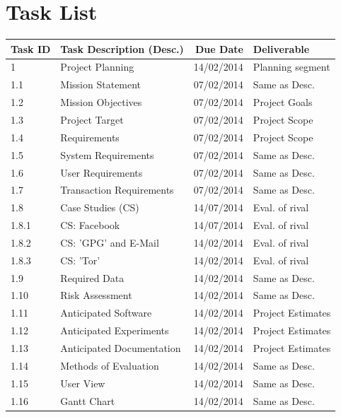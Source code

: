 
\section{Task List}

\begin{tabular}{llrl}

    \toprule
    
    Task ID  & Task Description (Desc.)     & Due Date    & Deliverable       \\
    
    \midrule
    
    1        & Project Planning             & 14/02/2014  & Planning segment  \\
    1.1      & Mission Statement            & 07/02/2014  & Same as Desc.     \\
    1.2      & Mission Objectives           & 07/02/2014  & Project Goals     \\
    1.3      & Project Target               & 07/02/2014  & Project Scope     \\
    1.4      & Requirements                 & 07/02/2014  & Project Scope     \\
    1.5      & System Requirements          & 07/02/2014  & Same as Desc.     \\
    1.6      & User Requirements            & 07/02/2014  & Same as Desc.     \\
    1.7      & Transaction Requirements     & 07/02/2014  & Same as Desc.     \\
    
    \cmidrule(r){2-3}
    1.8      & Case Studies (CS)            & 14/07/2014  & Eval. of rival    \\
    1.8.1    & CS: Facebook                 & 14/07/2014  & Eval. of rival    \\
    1.8.2    & CS: 'GPG' and E-Mail         & 14/02/2014  & Eval. of rival    \\
    1.8.3    & CS: 'Tor'                    & 14/02/2014  & Eval. of rival    \\
    \cmidrule(r){2-3}
    
    1.9      & Required Data                & 14/02/2014  & Same as Desc.     \\
    1.10     & Risk Assessment              & 14/02/2014  & Same as Desc.     \\
    1.11     & Anticipated Software         & 14/02/2014  & Project Estimates \\
    1.12     & Anticipated Experiments      & 14/02/2014  & Project Estimates \\
    1.13     & Anticipated Documentation    & 14/02/2014  & Project Estimates \\
    1.14     & Methods of Evaluation        & 14/02/2014  & Same as Desc.     \\
    1.15     & User View                    & 14/02/2014  & Same as Desc.     \\
    1.16     & Gantt Chart                  & 14/02/2014  & Same as Desc.     \\
    
    \bottomrule
    
\end{tabular}

